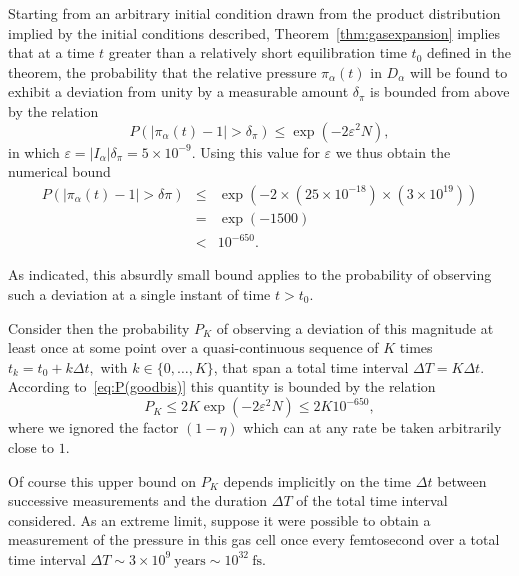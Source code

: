 \documentclass{article}
\numberwithin{equation}{section}
\begin{document}
Starting from an arbitrary initial condition drawn from the product distribution implied by the initial conditions described,
Theorem~\ref{thm:gasexpansion} implies that at a time $t$ greater than a relatively
short equilibration time $t_{0}$ defined in the theorem, the probability that
the relative pressure $\pi _{\alpha }\left( t\right)$ in $D_{\alpha}$ will be found to
exhibit a deviation from unity by a measurable amount $\delta_{\pi}$ is bounded from above by the
relation
\begin{equation*}
P\left( \left\vert \pi _{\alpha }\left( t\right) -1\right\vert >\delta_\pi
\right)  \leq \exp \left( -2\varepsilon ^{2}N\right) ,
\end{equation*}
in which $\varepsilon = |I_{\alpha}|\delta_{\pi} =5\times10^{-9}$.
Using this value for $\varepsilon $ we thus obtain the numerical bound
\begin{eqnarray*}
P\left( \left\vert \pi _{\alpha }\left( t\right) -1\right\vert >\delta\pi
\right)&\leq &\exp \left( -2\times (25\times 10^{-18})\times\left( 3\times 10^{19}\right) \right)  \\
&=&\exp \left( -1500\right)  \\
&<&10^{-650} .
\end{eqnarray*}

As indicated, this absurdly small bound applies to the probability of
observing such a deviation at a single instant of time $t>t_{0}.$

Consider then the probability $P_{K}$ of observing a deviation of this magnitude
at least once at some point over a quasi-continuous sequence
of $K$ times $t_{k}=t_{0}+k\Delta t,$ with $k\in \{0,\ldots ,K\}$, that
span a total time interval $\Delta T = K\Delta t$.   According to~\eqref{eq:P(goodbis)}
this quantity is bounded by the relation
\begin{equation*}
P_{K} \leq 2K\exp \left( -2\varepsilon ^{2}N\right)\leq 2K10^{-650},
\end{equation*}
where we ignored the factor $(1-\eta)$ which can at any rate be taken arbitrarily close to $1$.

Of course this upper bound on $P_{K}$ depends implicitly on the time $\Delta t$
between successive measurements and the duration $\Delta T$ of the total time
interval considered. As an extreme limit, suppose it were possible to obtain a
measurement of the pressure in this gas cell once every femtosecond
over a total time interval
$\Delta T \sim 3\times 10^{9}~\textrm{years}\sim 10^{32}~\textrm{fs}$.
\end{document}
